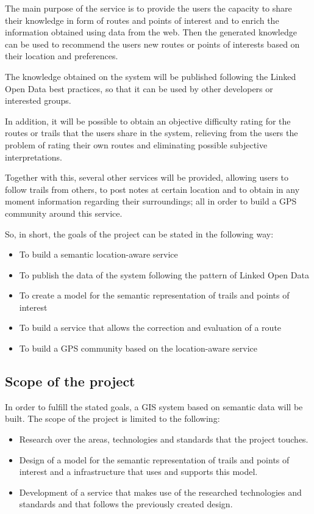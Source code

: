 The main purpose of the service is to provide the users the capacity to share their knowledge in form of routes and points of interest and to enrich the information obtained using data from the web. Then the generated knowledge can be used to recommend the users new routes or points of interests based on their location and preferences.

The knowledge obtained on the system will be published following the Linked Open Data best practices, so that it can be used by other developers or interested groups.

In addition, it will be possible to obtain an objective difficulty rating for the routes or trails that the users share in the system, relieving from the users the problem of rating their own routes and eliminating possible subjective interpretations.

Together with this, several other services will be provided, allowing users to follow trails from others, to post notes at certain location and to obtain in any moment information regarding their surroundings; all in order to build a GPS community around this service.

So, in short, the goals of the project can be stated in the following way:

\begin{itemize}
\item To build a semantic location-aware service
\item To publish the data of the system following the pattern of Linked Open Data
\item To create a model for the semantic representation of trails and points of interest
\item To build a service that allows the correction and evaluation of a route
\item To build a GPS community based on the location-aware service
\end{itemize}

\subsection{Scope of the project}

In order to fulfill the stated goals, a GIS system based on semantic data will be built. The scope of the project is limited to the following:

\begin{itemize}
\item Research over the areas, technologies and standards that the project touches.
\item Design of a model for the semantic representation of trails and points of interest and a infrastructure that uses and supports this model.
\item Development of a service that makes use of the researched technologies and standards and that follows the previously created design.
\end{itemize}

